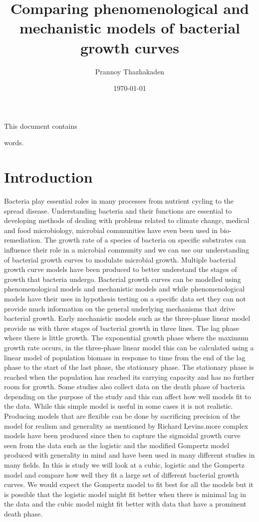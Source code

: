 \documentclass[11pt]{article}
\title{ Comparing phenomenological and mechanistic models of bacterial growth curves}
\author{ Prannoy Thazhakaden }
\date{\today}
\newcommand\wordcount{
    \immediate\write18{texcount -1 -sum -merge \jobname.tex > \jobname-words.sum }
    
}
\begin{document}
\maketitle	
\pagebreak

This document contains \wordcount{} words.

\pagebreak
\section{Introduction}

Bacteria play essential roles in many processes from nutrient cycling to the spread disease. Understanding bacteria and their functions are essential to developing methods of dealing with problems related to climate change, medical and food microbiology, microbial communities have even been used in bio-remediation. The growth rate of a species of bacteria on specific substrates can influence their role in a microbial community and we can use our understanding of bacterial growth curves to modulate microbial growth. Multiple bacterial growth curve models have been produced to better understand the stages of growth that bacteria undergo. Bacterial growth curves can be modelled using phenomenological models and mechanistic models and while phenomenological models have their uses in hypothesis testing on a specific data set they can not provide much information on the general underlying mechanisms that drive bacterial growth\cite{Zwietering1990ModelingCurve}. Early mechanistic models such as the three-phase linear model provide us with three stages of bacterial growth in three lines\cite{Buchanan1997WhenCurves}. The lag phase where there is little growth. The exponential growth phase where the maximum growth rate occurs, in the three-phase linear model this can be calculated using a linear model of population biomass in response to time from the end of the lag phase to the start of the last phase, the stationary phase. The stationary phase is reached when the population has reached its carrying capacity and has no further room for growth. Some studies also collect data on the death phase of bacteria depending on the purpose of the study and this can affect how well models fit to the data. While this simple model is useful in some cases it is not realistic. Producing models that are flexible can be done by sacrificing precision of the model for realism and generality as mentioned by Richard Levins\cite{RICHARDLEVINS1966THEBIOLOGY}.more complex models have been produced since then to capture the sigmoidal growth curve seen from the data such as the logistic and the modified Gompertz model produced with generality in mind and have been used in many different studies in many fields. In this is study we will look at a cubic, logistic and the Gompertz model and compare how well they fit a large set of different bacterial growth curves. We would expect the Gompertz model to fit best for all the models but it is possible that the logistic model might fit better when there is minimal lag in the data and the cubic model might fit better with data that have a prominent death phase.
\end{document}
